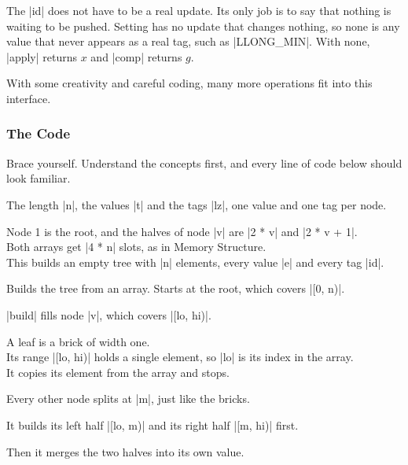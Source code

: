 The \code|id| does not have to be a real update. Its only job is to say that nothing is waiting to be pushed. Setting has no update that changes nothing, so none is any value that never appears as a real tag, such as \code|LLONG_MIN|. With none, \code|apply| returns \(x\) and \code|comp| returns \(g\).

With some creativity and careful coding, many more operations fit into this interface.

\subsubsection{The Code}
Brace yourself. Understand the concepts first, and every line of code below should look familiar.


\begin{notes}
\begin{lines}
\item[Lines 10--12] The length \code|n|, the values \code|t| and the tags \code|lz|, one value and one tag per node.
\item[Line 13] Node 1 is the root, and the halves of node \code|v| are \code|2 * v| and \code|2 * v + 1|. \\
Both arrays get \code|4 * n| slots, as in Memory Structure. \\
This builds an empty tree with \code|n| elements, every value \code|e| and every tag \code|id|.
\item[Lines 14--16] Builds the tree from an array. Starts at the root, which covers \code|[0, n)|.
\item[Line 17] \code|build| fills node \code|v|, which covers \code|[lo, hi)|.
\item[Line 18] A leaf is a brick of width one. \\
Its range \code|[lo, hi)| holds a single element, so \code|lo| is its index in the array. \\
It copies its element from the array and stops.
\item[Line 19] Every other node splits at \code|m|, just like the bricks.
\item[Line 20] It builds its left half \code|[lo, m)| and its right half \code|[m, hi)| first.
\item[Line 21] Then it merges the two halves into its own value.
\end{lines}
\end{notes}

